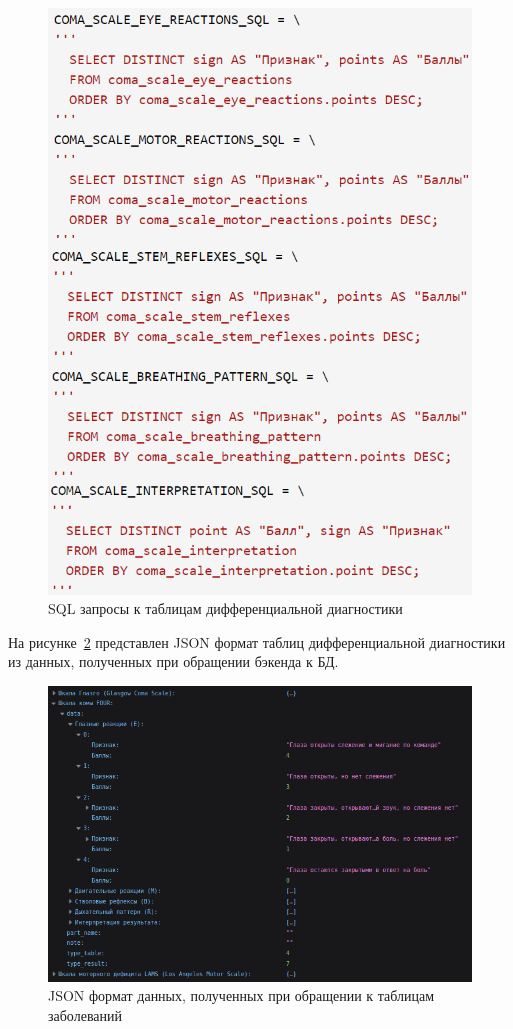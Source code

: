 \begin{figure}
  \includegraphics[scale=1.1]{inc/sh_one_table}
  \caption{SQL запросы к таблицам дифференциальной диагностики}
  \label{fig:fig27}
\end{figure}

На рисунке~\ref{fig:fig28} представлен JSON формат таблиц дифференциальной диагностики из данных, полученных при обращении бэкенда к БД.

\begin{figure}
  \includegraphics[scale=0.83]{inc/sh_one_table1}
  \caption{JSON формат данных, полученных при обращении к таблицам заболеваний}
  \label{fig:fig28}
\end{figure}

